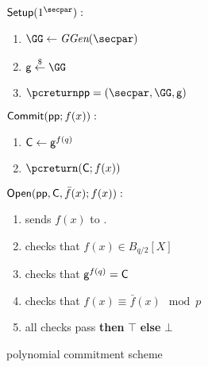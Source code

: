 \documentclass{article}
\theoremstyle{definition}
\begin{document}
\begin{figure}
\renewcommand{\figurename}{Protocol}
\caption{polynomial commitment scheme} \label{scheme:polynomial_commitment}
\noindent\begin{mdframed}[userdefinedwidth=\textwidth]
\begin{minipage}{\textwidth}
	\begin{flushleft}
	$\pro{Setup}(1^\secpar):$
		\begin{enumerate}[nolistsep]
			\item $ \GG \gets \ggen(\secpar)$
			\item $ \gr{g} \sample \GG$
			\item $\pcreturn \params = (\secpar,\GG,\gr{g})$
		\end{enumerate}
	$\textsf{{Commit}}(\textsf{pp};f(x)):$ 
		\begin{enumerate}[nolistsep]
			\item $\mathsf{C} \gets \mathsf{g}^{f(q)}$
			\item $\pcreturn (\gr{C};f(x))$
		\end{enumerate}
	$\textsf{{Open}}(\textsf{pp},\mathsf{C},\bar{f}(x);f(x)):$ 
		\begin{enumerate}[nolistsep]
		    \item \prover sends $f(x)$ to \verifier.
		    \item \verifier checks that $f(x)\in B_{q/2}[X]$
			\item \verifier checks that $\mathsf{g}^{f(q)} = \mathsf{C}$
			\item \verifier checks that $f(x) \equiv \bar{f}(x) \mod p$
			\item \pcif all checks pass \textbf{then} \pcreturn $\top$ \textbf{else} \pcreturn $\bot$
		\end{enumerate}
		\end{flushleft}
\end{minipage}
\end{mdframed}
\end{figure}
\end{document}
